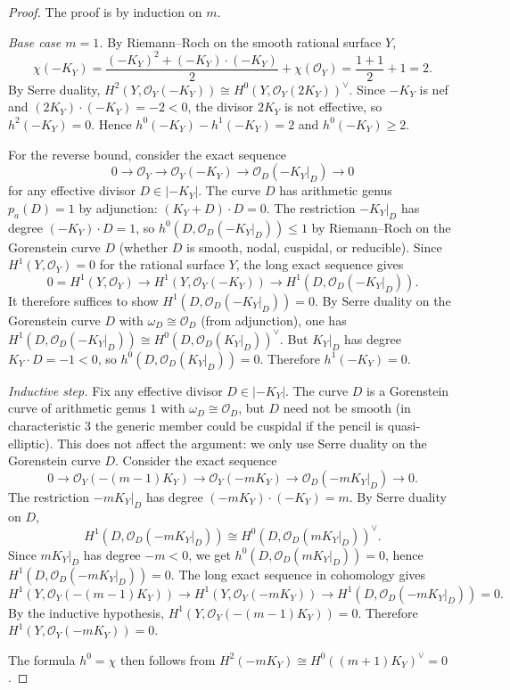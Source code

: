 \documentclass[11pt]{article}
\theoremstyle{definition}
\begin{document}
\begin{proof}
The proof is by induction on $m$.

\medskip
\noindent
\textit{Base case $m=1$.}
By Riemann--Roch on the smooth rational surface $Y$,
\[
\chi(-K_Y)=\frac{(-K_Y)^2+(-K_Y)\cdot(-K_Y)}{2}+\chi(\mathcal O_Y)=\frac{1+1}{2}+1=2.
\]
By Serre duality, $H^2(Y,\mathcal O_Y(-K_Y))\cong H^0(Y,\mathcal O_Y(2K_Y))^{\vee}$. Since $-K_Y$ is nef and $(2K_Y)\cdot(-K_Y)=-2<0$, the divisor $2K_Y$ is not effective, so $h^2(-K_Y)=0$. Hence $h^0(-K_Y)-h^1(-K_Y)=2$ and $h^0(-K_Y)\ge 2$.

For the reverse bound, consider the exact sequence
\[
0\to \mathcal O_Y\to \mathcal O_Y(-K_Y)\to \mathcal O_D(-K_Y|_D)\to 0
\]
for any effective divisor $D\in |-K_Y|$. The curve $D$ has arithmetic genus $p_a(D)=1$ by adjunction: $(K_Y+D)\cdot D=0$. The restriction $-K_Y|_D$ has degree $(-K_Y)\cdot D=1$, so $h^0(D,\mathcal O_D(-K_Y|_D))\le 1$ by Riemann--Roch on the Gorenstein curve $D$ (whether $D$ is smooth, nodal, cuspidal, or reducible). Since $H^1(Y,\mathcal O_Y)=0$ for the rational surface $Y$, the long exact sequence gives
\[
0=H^1(Y,\mathcal O_Y)\to H^1(Y,\mathcal O_Y(-K_Y))\to H^1(D,\mathcal O_D(-K_Y|_D)).
\]
It therefore suffices to show $H^1(D,\mathcal O_D(-K_Y|_D))=0$. By Serre duality on the Gorenstein curve $D$ with $\omega_D\cong \mathcal O_D$ (from adjunction), one has $H^1(D,\mathcal O_D(-K_Y|_D))\cong H^0(D,\mathcal O_D(K_Y|_D))^{\vee}$. But $K_Y|_D$ has degree $K_Y\cdot D=-1<0$, so $h^0(D,\mathcal O_D(K_Y|_D))=0$. Therefore $h^1(-K_Y)=0$.

\medskip
\noindent
\textit{Inductive step.}
Fix any effective divisor $D\in |-K_Y|$. The curve $D$ is a Gorenstein curve of arithmetic genus $1$ with $\omega_D\cong\mathcal O_D$, but $D$ need not be smooth (in characteristic $3$ the generic member could be cuspidal if the pencil is quasi-elliptic). This does not affect the argument: we only use Serre duality on the Gorenstein curve $D$. Consider the exact sequence
\[
0\to \mathcal O_Y(-(m-1)K_Y)\to \mathcal O_Y(-mK_Y)\to \mathcal O_D(-mK_Y|_D)\to 0.
\]
The restriction $-mK_Y|_D$ has degree $(-mK_Y)\cdot(-K_Y)=m$. By Serre duality on $D$,
\[
H^1(D,\mathcal O_D(-mK_Y|_D))\cong H^0(D,\mathcal O_D(mK_Y|_D))^{\vee}.
\]
Since $mK_Y|_D$ has degree $-m<0$, we get $h^0(D,\mathcal O_D(mK_Y|_D))=0$, hence $H^1(D,\mathcal O_D(-mK_Y|_D))=0$. The long exact sequence in cohomology gives
\[
H^1(Y,\mathcal O_Y(-(m-1)K_Y))\to H^1(Y,\mathcal O_Y(-mK_Y))\to H^1(D,\mathcal O_D(-mK_Y|_D))=0.
\]
By the inductive hypothesis, $H^1(Y,\mathcal O_Y(-(m-1)K_Y))=0$. Therefore $H^1(Y,\mathcal O_Y(-mK_Y))=0$.

The formula $h^0=\chi$ then follows from $H^2(-mK_Y)\cong H^0((m+1)K_Y)^{\vee}=0$.
\end{proof}
\end{document}
